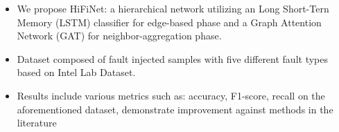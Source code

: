 \begin{itemize} 
  \item We propose HiFiNet: a hierarchical network utilizing an Long Short-Tern Memory (LSTM) classifier for edge-based phase and a Graph Attention Network (GAT) for neighbor-aggregation phase. 
  \item Dataset composed of fault injected samples with five different fault types based on Intel Lab Dataset. 
  \item Results include various metrics such as: accuracy, F1-score, recall on the aforementioned dataset, demonstrate improvement against methods in the literature \end{itemize}
